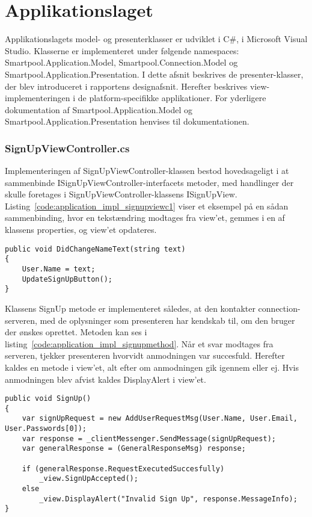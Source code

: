 \section{Applikationslaget}
Applikationslagets model- og presenterklasser er udviklet i C\#, i Microsoft Visual Studio. Klasserne er implementeret under følgende namespaces: Smartpool.Application.Model, Smartpool.Connection.Model og Smartpool.Application.Presentation. I dette afsnit beskrives de presenter-klasser, der blev introduceret i rapportens designafsnit. Herefter beskrives view-implementeringen i de platform-specifikke applikationer. For yderligere dokumentation af Smartpool.Application.Model og Smartpool.Application.Presentation henvises til dokumentationen.

\subsubsection{SignUpViewController.cs}
Implementeringen af SignUpViewController-klassen bestod hovedsageligt i at sammenbinde ISignUpViewController-interfacets metoder, med handlinger der skulle foretages i SignUpViewController-klassens ISignUpView. Listing~\ref{code:application_impl_signupviewc1} viser et eksempel på en sådan sammenbinding, hvor en tekstændring modtages fra view'et, gemmes i en af klassens properties, og view'et opdateres.

\begin{lstlisting}[caption={DidChangeNameText(...)},label={code:application_impl_signupviewc1}]
public void DidChangeNameText(string text)
{
	User.Name = text;
	UpdateSignUpButton();
}
\end{lstlisting}

Klassens SignUp metode er implementeret således, at den kontakter connection-serveren, med de oplysninger som presenteren har kendskab til, om den bruger der ønskes oprettet. Metoden kan ses i listing~\ref{code:application_impl_signupmethod}. Når et svar modtages fra serveren, tjekker presenteren hvorvidt anmodningen var succesfuld. Herefter kaldes en metode i view'et, alt efter om anmodningen gik igennem eller ej. Hvis anmodningen blev afvist kaldes DisplayAlert i view'et.

\begin{lstlisting}[caption={SignUp()},label={code:application_impl_signupmethod}]
public void SignUp()
{
	var signUpRequest = new AddUserRequestMsg(User.Name, User.Email, User.Passwords[0]);
	var response = _clientMessenger.SendMessage(signUpRequest);
	var generalResponse = (GeneralResponseMsg) response;

	if (generalResponse.RequestExecutedSuccesfully)
		_view.SignUpAccepted();
	else
		_view.DisplayAlert("Invalid Sign Up", response.MessageInfo);
}
\end{lstlisting}


